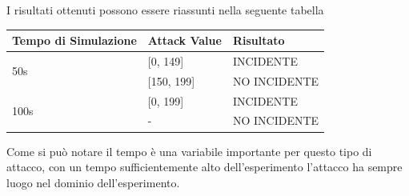  I risultati ottenuti possono essere riassunti nella seguente tabella
 
\renewcommand{\arraystretch}{2}
\begin{center}
	\begin{tabular}{ |p{6cm}|p{3cm}|p{4cm}|  }
		\hline
		Tempo di Simulazione& Attack Value & Risultato \\
		\hline
		\multirow{2}{4em}{50s} & [0, 149] & INCIDENTE \\
		\cline{2-3}
		& [150, 199] & NO INCIDENTE \\
		\hline
		\multirow{2}{4em}{100s} & [0, 199] & INCIDENTE \\
		\cline{2-3}
		& - & NO INCIDENTE \\
		\hline
	\end{tabular}
\end{center}
Come si può notare il tempo è una variabile importante per questo tipo di attacco, con un tempo sufficientemente alto dell'esperimento l'attacco ha sempre luogo nel dominio dell'esperimento.

